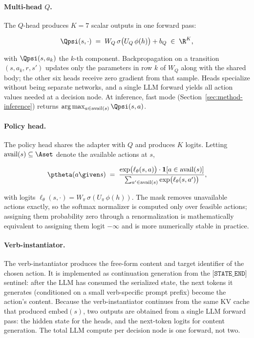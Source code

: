 \paragraph{Multi-head $Q$.}
The $Q$-head produces $K = 7$ scalar outputs in one forward pass:

\begin{equation}
\label{eq:qhead}
\Qpsi(s, \cdot) \;=\; W_{Q}\,\sigma\bigl(U_{Q}\,\phi(h)\bigr) + b_{Q} \;\in\; \R^{K},
\end{equation}

with $\Qpsi(s, a_{k})$ the $k$-th component. Backpropagation on a
transition $(s, a_{k}, r, s')$ updates only the parameters in row $k$
of $W_{Q}$ along with the shared body; the other six heads receive
zero gradient from that sample. Heads specialize without being
separate networks, and a single LLM forward yields all action values
needed at a decision node. At inference, fast mode
(Section~\ref{sec:method-inference}) returns
$\arg\max_{a \in \mathrm{avail}(s)} \Qpsi(s, a)$.

\paragraph{Policy head.}
The policy head shares the adapter with $Q$ and produces $K$ logits.
Letting $\mathrm{avail}(s) \subseteq \Aset$ denote the available
actions at $s$,

\begin{equation}
\label{eq:policy}
\ptheta(a \given s) \;=\;
\frac{\exp\bigl(\ell_{\theta}(s, a)\bigr) \cdot \mathbf{1}[a \in \mathrm{avail}(s)]}
     {\sum_{a' \in \mathrm{avail}(s)} \exp\bigl(\ell_{\theta}(s, a')\bigr)},
\end{equation}

with logits $\ell_{\theta}(s, \cdot) = W_{\pi}\,\sigma(U_{\pi}\,\phi(h))$.
The mask removes unavailable actions exactly, so the softmax normalizer
is computed only over feasible actions; assigning them probability zero
through a renormalization is mathematically equivalent to assigning
them logit $-\infty$ and is more numerically stable in practice.

\paragraph{Verb-instantiator.}
The verb-instantiator produces the free-form content and target
identifier of the chosen action. It is implemented as continuation
generation from the $\texttt{[STATE\_END]}$ sentinel: after the LLM
has consumed the serialized state, the next tokens it generates
(conditioned on a small verb-specific prompt prefix) become the
action's content. Because the verb-instantiator continues from the
same KV cache that produced $\mathrm{embed}(s)$, two outputs are
obtained from a single LLM forward pass: the hidden state for the
heads, and the next-token logits for content generation. The total
LLM compute per decision node is one forward, not two.

